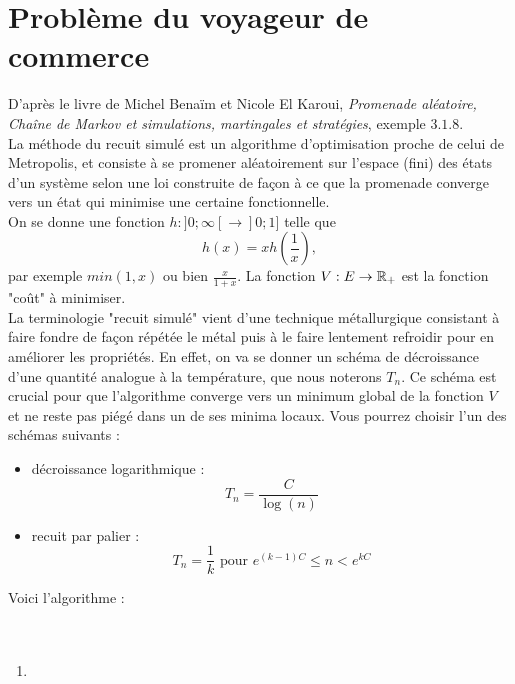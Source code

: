 \documentclass[a4paper]{article}
\begin{document}
\section{Problème du voyageur de commerce}
D'après le livre de Michel Benaïm et Nicole El Karoui, \textit{Promenade aléatoire, Chaîne de Markov et simulations, martingales et stratégies}, exemple $3.1.8$.\\

La méthode du recuit simulé est un algorithme d'optimisation proche de celui de Metropolis, et consiste à se promener aléatoirement sur l'espace (fini) des états d'un système selon une loi construite de façon à ce que la promenade converge vers un état qui minimise une certaine fonctionnelle.\\

On se donne une fonction $h :]0;\infty[\rightarrow ]0;1]$ telle que 
\[h(x)=xh(\frac{1}{x}),\]
par exemple $min(1,x)$ ou bien $\frac{x}{1+x}$. La fonction $V : E\rightarrow \mathbb R_+$ est la fonction "coût" à minimiser. \\

La terminologie "recuit simulé" vient d'une technique métallurgique consistant à faire fondre de façon répétée le métal puis à le faire lentement refroidir pour en améliorer les propriétés. En effet, on va se donner un schéma de décroissance d'une quantité analogue à la température, que nous noterons $T_n$. Ce schéma est crucial pour que l'algorithme converge vers un minimum global de la fonction $V$ et ne reste pas piégé dans un de ses minima locaux. Vous pourrez choisir l'un des schémas suivants :
\begin{itemize}
\item décroissance logarithmique : \[T_n = \frac{C}{\log (n)}\]
\item recuit par palier : \[T_n = \frac{1}{k}\text{ pour } e^{(k-1)C}\leq n < e^{kC}\]
\end{itemize}

Voici l'algorithme :\\

\\
\\

\begin{enumerate}
\item 
\end{enumerate}
\end{document}
